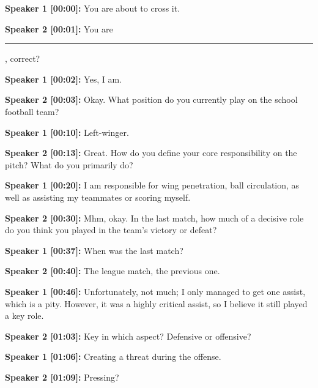 \documentclass[11pt,a4paper]{article}
\newcommand{\redacted}{\rule{2.5cm}{2ex}}
\begin{document}
\begin{linenumbers}

\noindent \textbf{Speaker 1 [00:00]:} You are about to cross it.

\vspace{0.5em}
\noindent \textbf{Speaker 2 [00:01]:} You are \redacted, correct? 

\vspace{0.5em}
\noindent \textbf{Speaker 1 [00:02]:} Yes, I am.

\vspace{0.5em}
\noindent \textbf{Speaker 2 [00:03]:} Okay. What position do you currently play on the school football team?

\vspace{0.5em}
\noindent \textbf{Speaker 1 [00:10]:} Left-winger.

\vspace{0.5em}
\noindent \textbf{Speaker 2 [00:13]:} Great. How do you define your core responsibility on the pitch? What do you primarily do?

\vspace{0.5em}
\noindent \textbf{Speaker 1 [00:20]:} I am responsible for wing penetration, ball circulation, as well as assisting my teammates or scoring myself.

\vspace{0.5em}
\noindent \textbf{Speaker 2 [00:30]:} Mhm, okay. In the last match, how much of a decisive role do you think you played in the team's victory or defeat?

\vspace{0.5em}
\noindent \textbf{Speaker 1 [00:37]:} When was the last match?

\vspace{0.5em}
\noindent \textbf{Speaker 2 [00:40]:} The league match, the previous one.

\vspace{0.5em}
\noindent \textbf{Speaker 1 [00:46]:} Unfortunately, not much; I only managed to get one assist, which is a pity. However, it was a highly critical assist, so I believe it still played a key role.

\vspace{0.5em}
\noindent \textbf{Speaker 2 [01:03]:} Key in which aspect? Defensive or offensive?

\vspace{0.5em}
\noindent \textbf{Speaker 1 [01:06]:} Creating a threat during the offense.

\vspace{0.5em}
\noindent \textbf{Speaker 2 [01:09]:} Pressing? 


\end{linenumbers}
\end{document}
